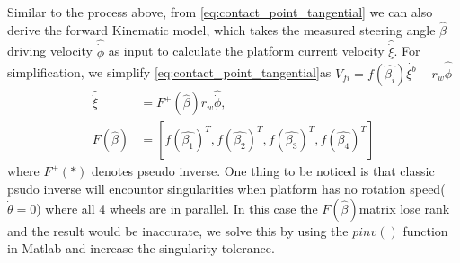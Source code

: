 Similar to the process above, from \cref{eq:contact_point_tangential} we can also derive the forward Kinematic model, which takes the measured steering angle $\hat{\beta}$ driving velocity $\hat{\dot{\phi}}$ as input to 
calculate the platform current velocity $\hat{\dot{\xi}}$. For simplification, we simplify \cref{eq:contact_point_tangential}as $V_{fi}=f(\hat{\beta_i})\dot{\xi^b} -r_w\hat{\dot{\phi}}$
\begin{equation}
	\label{eq:forwardKinematics}
	\begin{split}
	\hat{\dot{\xi}} &= F^+(\hat{\beta})r_w\hat{\dot{\phi}},\\
	F(\hat{\beta}) &= [f(\hat{\beta_1})^T, f(\hat{\beta_2})^T, f(\hat{\beta_3})^T, f(\hat{\beta_4})^T]
	\end{split}
	\end{equation}
where $F^+(*)$ denotes pseudo inverse. One thing to be noticed is that classic psudo inverse will encountor singularities when platform has no rotation speed($\dot{\theta}=0$) where all 4 wheels are in parallel. In this case the $F(\hat{\beta})$matrix lose rank and the result would be inaccurate, we solve this by using the $pinv()$ function in Matlab and increase the singularity tolerance.


